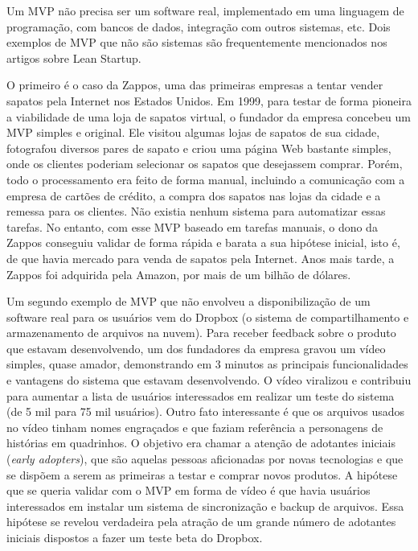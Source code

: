 \documentclass[
  11pt,
  twoside]{book}
\begin{document}
Um MVP não precisa ser um software real, implementado em uma linguagem
de programação, com bancos de dados, integração com outros sistemas,
etc. Dois exemplos de MVP que não são sistemas são frequentemente
mencionados nos artigos sobre Lean Startup.

  O primeiro é o
caso da Zappos, uma das primeiras empresas a tentar vender sapatos pela
Internet nos Estados Unidos. Em 1999, para testar de forma pioneira a
viabilidade de uma loja de sapatos virtual, o fundador da empresa
concebeu um MVP simples e original. Ele visitou algumas lojas de sapatos
de sua cidade, fotografou diversos pares de sapato e criou uma página
Web bastante simples, onde os clientes poderiam selecionar os sapatos
que desejassem comprar. Porém, todo o processamento era feito de forma
manual, incluindo a comunicação com a empresa de cartões de crédito, a
compra dos sapatos nas lojas da cidade e a remessa para os clientes. Não
existia nenhum sistema para automatizar essas tarefas. No entanto, com
esse MVP baseado em tarefas manuais, o dono da Zappos conseguiu validar
de forma rápida e barata a sua hipótese inicial, isto é, de que havia
mercado para venda de sapatos pela Internet. Anos mais tarde, a Zappos
foi adquirida pela Amazon, por mais de um bilhão de dólares.

 

Um segundo exemplo de MVP que não envolveu a disponibilização de um
software real para os usuários vem do Dropbox (o sistema de
compartilhamento e armazenamento de arquivos na nuvem). Para receber
feedback sobre o produto que estavam desenvolvendo, um dos fundadores da
empresa gravou um vídeo simples, quase amador, demonstrando em 3 minutos
as principais funcionalidades e vantagens do sistema que estavam
desenvolvendo. O vídeo viralizou e contribuiu para aumentar a lista de
usuários interessados em realizar um teste do sistema (de 5 mil para 75
mil usuários). Outro fato interessante é que os arquivos usados no vídeo
tinham nomes engraçados e que faziam referência a personagens de
histórias em quadrinhos. O objetivo era chamar a atenção de adotantes
iniciais (\emph{early adopters}), que são aquelas pessoas aficionadas
por novas tecnologias e que se dispõem a serem as primeiras a testar e
comprar novos produtos. A hipótese que se queria validar com o MVP em
forma de vídeo é que havia usuários interessados em instalar um sistema
de sincronização e backup de arquivos. Essa hipótese se revelou
verdadeira pela atração de um grande número de adotantes iniciais
dispostos a fazer um teste beta do Dropbox.
\end{document}
